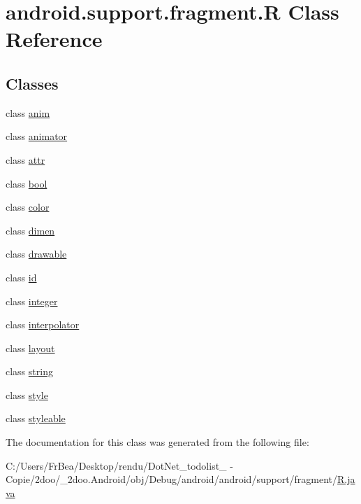 \hypertarget{classandroid_1_1support_1_1fragment_1_1_r}{
\section{android.support.fragment.R Class Reference}
\label{classandroid_1_1support_1_1fragment_1_1_r}
}
\subsection*{Classes}
\begin{CompactItemize}
\item 
class \hyperlink{classandroid_1_1support_1_1fragment_1_1_r_1_1anim}{anim}
\item 
class \hyperlink{classandroid_1_1support_1_1fragment_1_1_r_1_1animator}{animator}
\item 
class \hyperlink{classandroid_1_1support_1_1fragment_1_1_r_1_1attr}{attr}
\item 
class \hyperlink{classandroid_1_1support_1_1fragment_1_1_r_1_1bool}{bool}
\item 
class \hyperlink{classandroid_1_1support_1_1fragment_1_1_r_1_1color}{color}
\item 
class \hyperlink{classandroid_1_1support_1_1fragment_1_1_r_1_1dimen}{dimen}
\item 
class \hyperlink{classandroid_1_1support_1_1fragment_1_1_r_1_1drawable}{drawable}
\item 
class \hyperlink{classandroid_1_1support_1_1fragment_1_1_r_1_1id}{id}
\item 
class \hyperlink{classandroid_1_1support_1_1fragment_1_1_r_1_1integer}{integer}
\item 
class \hyperlink{classandroid_1_1support_1_1fragment_1_1_r_1_1interpolator}{interpolator}
\item 
class \hyperlink{classandroid_1_1support_1_1fragment_1_1_r_1_1layout}{layout}
\item 
class \hyperlink{classandroid_1_1support_1_1fragment_1_1_r_1_1string}{string}
\item 
class \hyperlink{classandroid_1_1support_1_1fragment_1_1_r_1_1style}{style}
\item 
class \hyperlink{classandroid_1_1support_1_1fragment_1_1_r_1_1styleable}{styleable}
\end{CompactItemize}


The documentation for this class was generated from the following file:\begin{CompactItemize}
\item 
C:/Users/FrBea/Desktop/rendu/DotNet\_\-todolist\_ - Copie/2doo/\_\-2doo.Android/obj/Debug/android/android/support/fragment/\hyperlink{android_2support_2fragment_2_r_8java}{R.java}\end{CompactItemize}
